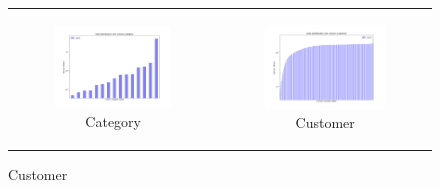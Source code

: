 \begin{figure}
{\begin{tabular}[c]{cc}
     \begin{subfigure}[c]{0.45\textwidth}
         \centering
         \includegraphics[width=\textwidth]{assets/results/syntheticFincances/distribution/category.png}
         \caption{Category}
         \label{}
     \end{subfigure} &
     
     \begin{subfigure}[c]{0.45\textwidth}
         \centering
         \includegraphics[width=\textwidth]{assets/results/syntheticFincances/distribution/customer.png}
         \caption{Customer}
         \label{}
     \end{subfigure} \\
     

\end{tabular}}
\end{figure}

